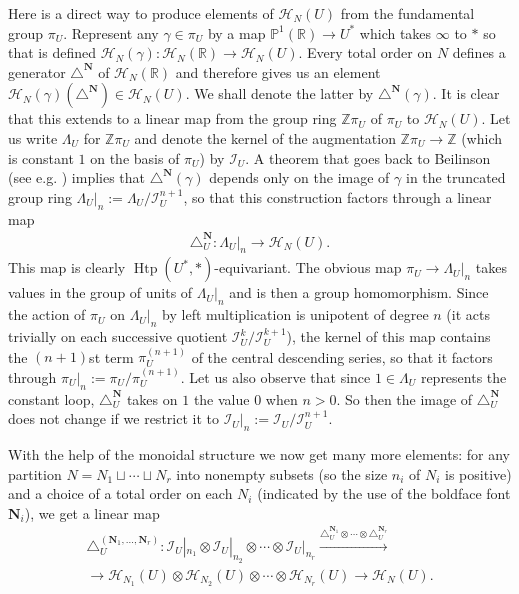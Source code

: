 \documentclass[12pt,letterpaper]{amsart}
\numberwithin{equation}{section}
\def\Nbold{{\mathbf N}}
\def\PP{{\mathbb P}}
\def\RR{{\mathbb R}}
\def\ZZ{{\mathbb Z}}
\def\g{\gamma}
\def\tri{\triangle}
\def\Hcal{{\mathcal H}}
\def\Ical{{\mathcal I}}
\newcommand\Htp{\operatorname{Htp}}
\theoremstyle{remark}
\begin{document}
Here is a direct way to produce  elements of $\Hcal_N(U)$  from the fundamental group $\pi_U$.
Represent any $\g\in \pi_U$  by a map $\PP^1(\RR)\to U^*$ which takes $\infty$ to $*$ so that is defined 
$\Hcal_N(\g):  \Hcal_N(\RR)\to \Hcal_N(U)$.  Every total order on $N$ defines a generator $\tri^\Nbold$ of $\Hcal_N(\RR)$ and therefore gives  us an element $\Hcal_N(\g)(\tri^\Nbold)\in  \Hcal_N(U)$. We shall denote  the latter by $\tri^\Nbold(\g)$. It is clear that this extends to a linear map from the group ring $\ZZ\pi_U$ of $\pi_U$ to $\Hcal_N(U)$. Let us write  $\Lambda_{U}$ for  $\ZZ\pi_U$ and denote the kernel of the augmentation 
$\ZZ\pi_U\to \ZZ$ (which is constant $1$ on the basis of $\pi_U$) by $\Ical_U$. A theorem that goes back to Beilinson (see  e.g. \cite{looij:BDG}) implies  that  $\triangle^\Nbold(\g)$ depends only on the image of $\g$ in the truncated group ring $\Lambda_{U}|_n:=\Lambda_{U}/\Ical_{U}^{n+1}$, so that this construction factors through a linear map
\begin{gather*}
\triangle_U^\Nbold: \Lambda_{U}|_n\to  \Hcal_N(U).
\end{gather*}
This map is clearly $\Htp(U^*,*)$-equivariant. The obvious map $\pi_U\to  \Lambda_{U}|_n$ takes values in the group of units of $\Lambda_{U}|_n$ and is then a group homomorphism. Since the action of $\pi_U$ on  $\Lambda_{U}|_n$ by left multiplication is unipotent of degree $n$ (it acts trivially on each successive quotient
$\Ical_U^k/\Ical_U^{k+1}$),  the kernel  of this map contains the $(n+1)$st term 
$\pi_U^{(n+1)}$ of the central descending series, so that it factors through $\pi_U|_n:=\pi_U/\pi_U^{(n+1)}$.  
Let us also observe that since $1\in \Lambda_U$ represents the constant loop,  $\triangle_U^\Nbold$ takes on $1$ the value  $0$ when  $n>0$. So then  the image of $\triangle_U^\Nbold$ does not change if we restrict it  to $\Ical_{U}|_n:=\Ical_U/\Ical_U^{n+1}$. 

With the help of  the monoidal structure we now get many more elements: for any  partition  $N=N_1\sqcup \cdots\sqcup N_r$ into nonempty subsets (so the size $n_i$ of $N_i$ is positive) and a choice of a total order on each $N_i$ (indicated by the use of the boldface font $\Nbold_i$),  we get a linear map 
\begin{multline}\label{eqn:tensormap1}
\tri_U^{(\Nbold_1, \dots,\Nbold_r)}: \Ical_{U}|_{n_1}\otimes\Ical_{U}|_{n_2}\otimes\cdots\otimes \Ical_{U}|_{n_r}
\xrightarrow{\triangle_U^{\Nbold_1}\otimes\cdots\otimes \triangle_U^{\Nbold_r}}\\
\to \Hcal_{N_1}(U)\otimes\Hcal_{N_2}(U)\otimes\cdots \otimes\Hcal_{N_r}(U)\to \Hcal_N(U).
\end{multline}
\end{document}
